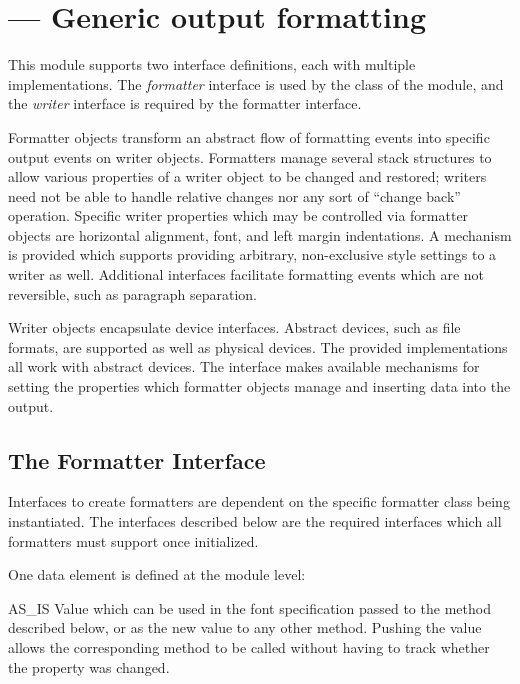 \section{ ---
         Generic output formatting}




This module supports two interface definitions, each with multiple
implementations.  The \emph{formatter} interface is used by the
 class of the  module, and the
\emph{writer} interface is required by the formatter interface.

Formatter objects transform an abstract flow of formatting events into
specific output events on writer objects.  Formatters manage several
stack structures to allow various properties of a writer object to be
changed and restored; writers need not be able to handle relative
changes nor any sort of ``change back'' operation.  Specific writer
properties which may be controlled via formatter objects are
horizontal alignment, font, and left margin indentations.  A mechanism
is provided which supports providing arbitrary, non-exclusive style
settings to a writer as well.  Additional interfaces facilitate
formatting events which are not reversible, such as paragraph
separation.

Writer objects encapsulate device interfaces.  Abstract devices, such
as file formats, are supported as well as physical devices.  The
provided implementations all work with abstract devices.  The
interface makes available mechanisms for setting the properties which
formatter objects manage and inserting data into the output.


\subsection{The Formatter Interface \label{formatter-interface}}

Interfaces to create formatters are dependent on the specific
formatter class being instantiated.  The interfaces described below
are the required interfaces which all formatters must support once
initialized.

One data element is defined at the module level:


\begin{datadesc}{AS_IS}
Value which can be used in the font specification passed to the
 method described below, or as the new value to any
other  method.  Pushing the 
value allows the corresponding  method to
be called without having to track whether the property was changed.
\end{datadesc}

